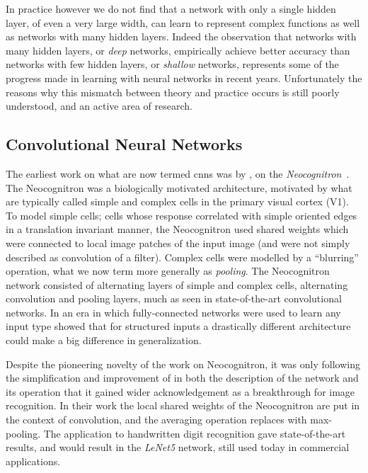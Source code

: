 \documentclass[thesis]{subfiles}
\begin{document}
In practice however we do not find that a network with only a single hidden layer, of even a very large width, can learn to represent complex functions as well as networks with many hidden layers. Indeed the observation that networks with many hidden layers, or \emph{deep} networks, empirically achieve better accuracy than networks with few hidden layers, or \emph{shallow} networks, represents some of the progress made in learning with neural networks in recent years. Unfortunately the reasons why this mismatch between theory and practice occurs is still poorly understood, and an active area of research.

\subsection{Convolutional Neural Networks}\label{cnns}
The earliest work on what are now termed \glspl{cnn} was by \citeauthor{Fuk80}, on the \emph{Neocognitron}~\citep{Fuk80,fukushima2013artificial}. The Neocognitron was a biologically motivated architecture, motivated by what are typically called simple and complex cells in the primary visual cortex (V1). To model simple cells; cells whose response correlated with simple oriented edges in a translation invariant manner, the Neocognitron used shared weights which were connected to local image patches of the input image (and were not simply described as convolution of a filter). Complex cells were modelled by a ``blurring'' operation, what we now term more generally as \emph{pooling}. The Neocognitron network consisted of alternating layers of simple and complex cells, \ie alternating convolution and pooling layers, much as seen in state-of-the-art convolutional networks. In an era in which fully-connected networks were used to learn any input type \citeauthor{Fuk80} showed that for structured inputs a drastically different architecture could make a big difference in generalization. 

Despite the pioneering novelty of the work on Neocognitron, it was only following the simplification and improvement of \citet{Lecun1998} in both the description of the network and its operation that it gained wider acknowledgement as a breakthrough for image recognition. In their work the local shared weights of the Neocognitron are put in the context of convolution, and the averaging operation replaces with max-pooling. The application to handwritten digit recognition gave state-of-the-art results, and would result in the \emph{LeNet5} network, still used today in commercial applications.
\end{document}
